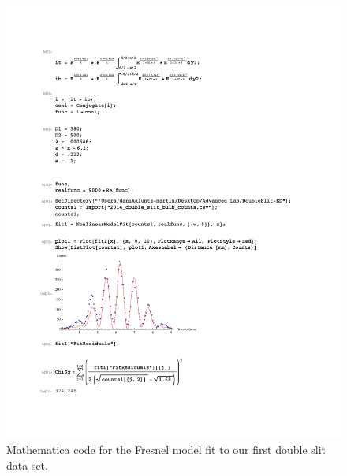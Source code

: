 \documentclass[prb,preprint]{revtex4-1}
\begin{document}
\begin{figure}[h!]
\centering
\includegraphics[width=6in]{DoubleSlitFresnel1.pdf}
\caption{Mathematica code for the Fresnel model fit to our first double slit data set.}
\label{DoubleSlitFresnel1}
\end{figure}
\end{document}
